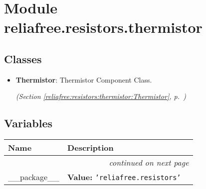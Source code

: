 %
%
%


\section{Module reliafree.resistors.thermistor}

    \label{reliafree:resistors:thermistor}


\subsection{Classes}

\begin{itemize}  \setlength{\parskip}{0ex}
  \item \textbf{Thermistor}: Thermistor Component Class.



  \textit{(Section \ref{reliafree:resistors:thermistor:Thermistor}, p.~\pageref{reliafree:resistors:thermistor:Thermistor})}

\end{itemize}


  \subsection{Variables}

    \vspace{-1cm}
\hspace{\varindent}\begin{longtable}{|p{\varnamewidth}|p{\vardescrwidth}|l}
\cline{1-2}
\cline{1-2} \centering \textbf{Name} & \centering \textbf{Description}& \\
\cline{1-2}
\endhead\cline{1-2}\multicolumn{3}{r}{\small\textit{continued on next page}}\\\endfoot\cline{1-2}
\endlastfoot\raggedright \_\-\_\-p\-a\-c\-k\-a\-g\-e\-\_\-\_\- & \raggedright \textbf{Value:} 
{\tt \texttt{'}\texttt{reliafree.resistors}\texttt{'}}&\\
\cline{1-2}
\end{longtable}


